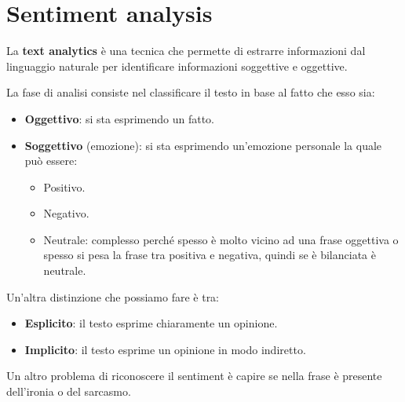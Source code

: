 \section{Sentiment analysis}
\begin{definizione}
      La \textbf{text analytics} è una tecnica che permette di estrarre informazioni
      dal linguaggio naturale per identificare informazioni soggettive e oggettive.
\end{definizione}
La fase di analisi consiste nel classificare il testo in base al fatto che esso
sia:
\begin{itemize}
      \item \textbf{Oggettivo}: si sta esprimendo un fatto.
      \item \textbf{Soggettivo} (emozione): si sta esprimendo un'emozione personale la quale
            può essere:
            \begin{itemize}
                  \item Positivo.
                  \item Negativo.
                  \item Neutrale: complesso perché spesso è molto vicino ad una
                        frase oggettiva o spesso si pesa la frase tra positiva e
                        negativa, quindi se è bilanciata è neutrale.
            \end{itemize}
\end{itemize}
Un'altra distinzione che possiamo fare è tra:
\begin{itemize}
      \item \textbf{Esplicito}: il testo esprime chiaramente un opinione.
      \item \textbf{Implicito}: il testo esprime un opinione in modo indiretto.
\end{itemize}
Un altro problema di riconoscere il sentiment è capire se nella frase è
presente dell'ironia o del sarcasmo.
